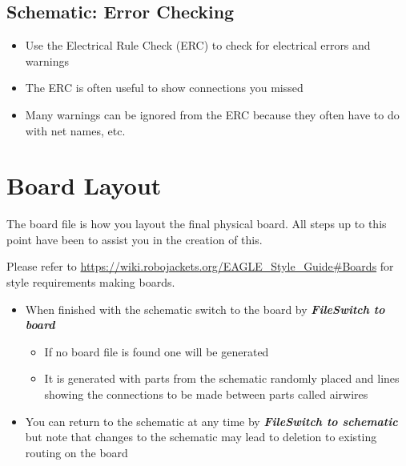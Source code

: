 \documentclass{article}
\begin{document}
\subsection{Schematic: Error Checking}
\begin{itemize}
    \item Use the Electrical Rule Check (ERC) to check for electrical errors
    and warnings
    \item The ERC is often useful to show connections you missed
    \item Many warnings can be ignored from the ERC because they often have to do with net names, etc.
\end{itemize}

\section{Board Layout}
The board file is how you layout the final physical board. All steps up to this point have been to assist you in the creation of this.
\par Please refer to \url{https://wiki.robojackets.org/EAGLE_Style_Guide#Boards} for style requirements making boards.
\begin{itemize}
    \item When finished with the schematic switch to the board by
    \textit{\textbf{File\textrightarrow Switch to board}}
    \begin{itemize}
        \item If no board file is found one will be generated
        \item It is generated with parts from the schematic randomly placed and lines showing the connections to be made between parts called airwires
    \end{itemize}
    \item You can return to the schematic at any time by \textit{\textbf{File\textrightarrow Switch to schematic}} but note that changes to the schematic may lead to deletion to existing routing on the board 
\end{itemize}
\end{document}
